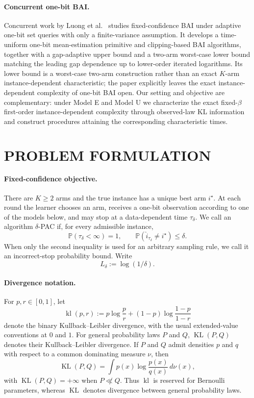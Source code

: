 \documentclass[twoside]{article}
\theoremstyle{definition}
\newcommand{\Pp}{\mathbb P}
\newcommand{\KL}{\operatorname{KL}}
\newcommand{\kl}{\operatorname{kl}}
\newcommand{\1}{\mathbf 1}
\newcommand{\Ldelta}{L_\delta}
\begin{document}
\paragraph{Concurrent one-bit BAI.}
Concurrent work by Luong et al.~\cite{Luong2026NearlyOptimal} studies
fixed-confidence BAI under adaptive one-bit set queries with only a finite-variance
assumption.  It develops a time-uniform one-bit mean-estimation primitive and
clipping-based BAI algorithms, together with a gap-adaptive upper bound and a
two-arm worst-case lower bound matching the leading gap dependence up to
lower-order iterated logarithms.  Its lower bound is a worst-case two-arm
construction rather than an exact $K$-arm instance-dependent characteristic;
the paper explicitly leaves the exact instance-dependent complexity of one-bit
BAI open.  Our setting and objective are complementary: under Model E and
Model U we characterize the exact fixed-$\beta$ first-order
instance-dependent complexity through observed-law KL information and construct
procedures attaining the corresponding characteristic times.

\section{PROBLEM FORMULATION}
\label{sec:problem}
\paragraph{Fixed-confidence objective.}
There are $K\ge2$ arms and the true instance has a unique best arm $i^\star$.  At each round the learner chooses an arm, receives a one-bit observation according to one of the models below, and may stop at a data-dependent time $\tau_\delta$.  We call an algorithm $\delta$-PAC if, for every admissible instance,
\begin{equation}
\Pp(\tau_\delta<\infty)=1,
\qquad
\Pp(\widehat i_{\tau_\delta}\neq i^\star)\le\delta.
\label{eq:pac}
\end{equation}
When only the second inequality is used for an arbitrary sampling rule, we call it an incorrect-stop probability bound.
Write
\[
\Ldelta:=\log(1/\delta).
\]
\paragraph{Divergence notation.}
For $p,r\in[0,1]$, let
\[
\kl(p,r)
:=
p\log\frac{p}{r}
+(1-p)\log\frac{1-p}{1-r}
\]
denote the binary Kullback--Leibler divergence, with the usual extended-value
conventions at $0$ and $1$.  For general probability laws $P$ and $Q$,
$\KL(P,Q)$ denotes their Kullback--Leibler divergence.  If $P$ and $Q$ admit
densities $p$ and $q$ with respect to a common dominating measure $\nu$, then
\[
\KL(P,Q)=\int p(x)\log\frac{p(x)}{q(x)}\,d\nu(x),
\]
with $\KL(P,Q)=+\infty$ when $P\not\ll Q$.  Thus $\kl$ is reserved for
Bernoulli parameters, whereas $\KL$ denotes divergence between general
probability laws.
\end{document}
